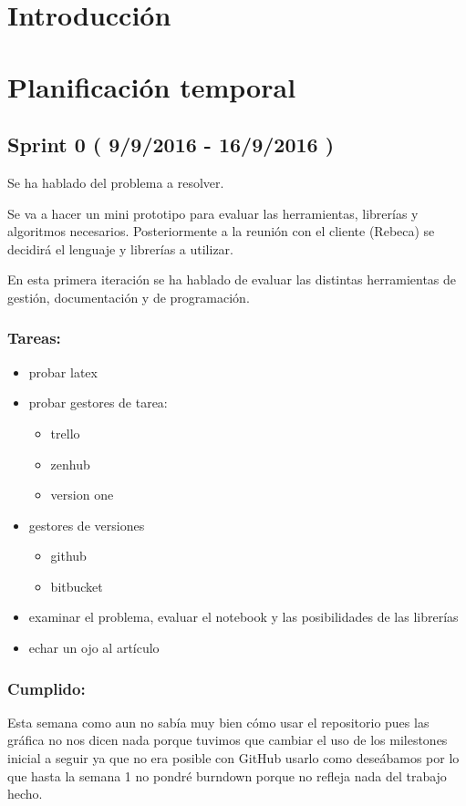 
\section{Introducción}

\section{Planificación temporal}

\subsection{Sprint 0 ( 9/9/2016 - 16/9/2016 )}
Se ha hablado del problema a resolver.

Se va a hacer un mini prototipo para evaluar las herramientas, librerías y algoritmos necesarios. Posteriormente a la reunión con el cliente (Rebeca) se decidirá el lenguaje y librerías a utilizar.

En esta primera iteración se ha hablado de evaluar las distintas herramientas de gestión, documentación y de programación.

\subsubsection{Tareas:}

\begin{itemize}
	\item probar latex 
	\item probar gestores de tarea: 
	\begin{itemize}
	\item trello 
	\item zenhub 
	\item version one
	\end{itemize}
	\item gestores de versiones 
	\begin{itemize}
	\item github 
	\item bitbucket 
	\end{itemize}
	\item examinar el problema, evaluar el notebook y las posibilidades de las librerías \\
	\item echar un ojo al artículo 
\end{itemize}

\subsubsection{Cumplido:}
Esta semana como aun no sabía muy bien cómo usar el repositorio pues las gráfica no nos dicen nada porque tuvimos que cambiar el uso de los milestones inicial a seguir ya que no era posible con GitHub usarlo como deseábamos por lo que hasta la semana 1 no pondré burndown porque no refleja nada del trabajo hecho.

